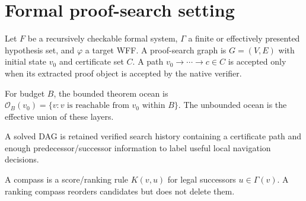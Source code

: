 \documentclass[11pt]{article}
\begin{document}
\section{Formal proof-search setting}
Let $F$ be a recursively checkable formal system, $\Gamma$ a finite or effectively presented hypothesis set, and $\varphi$ a target WFF. A proof-search graph is $G=(V,E)$ with initial state $v_0$ and certificate set $C$. A path $v_0\to\cdots\to c\in C$ is accepted only when its extracted proof object is accepted by the native verifier.
\begin{definition}For budget $B$, the bounded theorem ocean is $\mathcal O_B(v_0)=\{v: v\text{ is reachable from }v_0\text{ within }B\}$. The unbounded ocean is the effective union of these layers.\end{definition}
\begin{definition}A solved DAG is retained verified search history containing a certificate path and enough predecessor/successor information to label useful local navigation decisions.\end{definition}
\begin{definition}A compass is a score/ranking rule $K(v,u)$ for legal successors $u\in\Gamma(v)$. A ranking compass reorders candidates but does not delete them.\end{definition}
\end{document}
